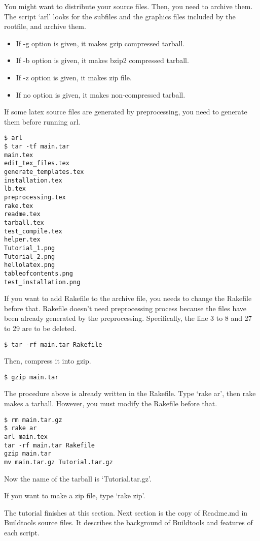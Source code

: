 You might want to distribute your source files.
Then, you need to archive them.
The script `arl' looks for the subfiles and the graphics files included by the rootfile, and archive them.
\begin{itemize}
\item If -g option is given, it makes gzip compressed tarball.
\item If -b option is given, it makes bzip2 compressed tarball.
\item If -z option is given, it makes zip file.
\item If no option is given, it makes non-compressed tarball.
\end{itemize}

If some latex source files are generated by preprocessing, you need to generate them before running arl.
\begin{verbatim}
$ arl
$ tar -tf main.tar
main.tex
edit_tex_files.tex
generate_templates.tex
installation.tex
lb.tex
preprocessing.tex
rake.tex
readme.tex
tarball.tex
test_compile.tex
helper.tex
Tutorial_1.png
Tutorial_2.png
hellolatex.png
tableofcontents.png
test_installation.png
\end{verbatim}

If you want to add Rakefile to the archive file, you needs to change the Rakefile before that.
Rakefile doesn't need preprocessing process because the files have been already generated by the preprocessing.
Specifically, the line 3 to 8 and 27 to 29 are to be deleted.
\begin{verbatim}
$ tar -rf main.tar Rakefile
\end{verbatim}
Then, compress it into gzip.
\begin{verbatim}
$ gzip main.tar
\end{verbatim}

The procedure above is already written in the Rakefile.
Type `rake ar', then rake makes a tarball.
However, you must modify the Rakefile before that.
\begin{verbatim}
$ rm main.tar.gz
$ rake ar
arl main.tex
tar -rf main.tar Rakefile
gzip main.tar
mv main.tar.gz Tutorial.tar.gz
\end{verbatim}
Now the name of the tarball is `Tutorial.tar.gz'.

If you want to make a zip file, type `rake zip'.

The tutorial finishes at this section.
Next section is the copy of Readme.md in Buildtools source files.
It describes the background of Buildtools and features of each script.
